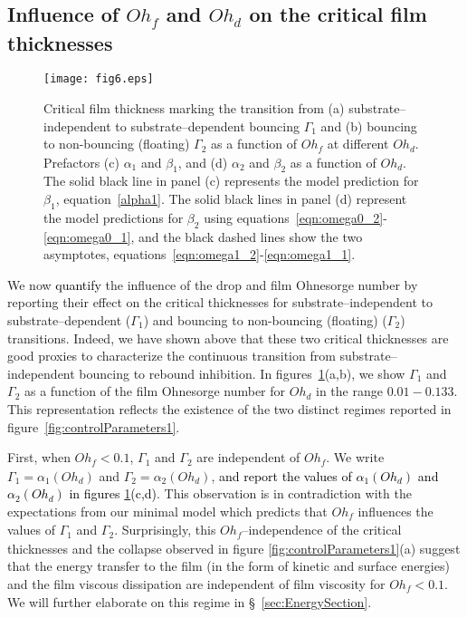 \documentclass[]{jfm}
\newcommand{\revRev}[1]{\textcolor{black}{#1}}
\newcommand{\Ohd}{\mathit{Oh}_\mathit{d}}
\newcommand{\Ohf}{\mathit{Oh}_\mathit{f}}
\begin{document}
\subsection{Influence of $\Ohf$ and $\Ohd$ on the critical film thicknesses}
\begin{figure}
	\centering
	\texttt{[image: fig6.eps]}
	\caption{Critical film thickness marking the transition from (a) substrate--independent to substrate--dependent bouncing $\Gamma_1$ and (b) bouncing to non-bouncing (floating) $\Gamma_2$ as a function of $\Ohf$ at different $\Ohd$. 
		Prefactors (c) $\alpha_{1}$ and $\beta_{1}$, and (d) $\alpha_{2}$ and $\beta_{2}$ as a function of $\Ohd$. 
		The solid black line in panel (c) represents the model prediction for $\beta_1$, equation~\eqref{alpha1}. 
		The solid black lines in panel (d) represent the model predictions for $\beta_2$ using equations~\eqref{eqn:omega0_2}-\eqref{eqn:omega0_1}, and the black dashed lines show the two asymptotes, equations~\eqref{eqn:omega1_2}-\eqref{eqn:omega1_1}.}
	\label{fig:Gamma1Gamma2}
\end{figure}

We now \revRev{quantify} the influence of the drop and film Ohnesorge number by reporting their effect on the critical thicknesses for substrate--independent to substrate--dependent ($\Gamma_1$) and bouncing to non-bouncing (floating) ($\Gamma_2$) transitions. Indeed, we have shown above that these two critical thicknesses are good proxies to characterize the continuous transition from substrate--independent bouncing to rebound inhibition. In figures~\ref{fig:Gamma1Gamma2}(a,b), we show $\Gamma_1$ and $\Gamma_2$ as a function of the film Ohnesorge number for $\Ohd$ in the range $0.01 - 0.133$. This representation reflects the existence of the two distinct regimes reported in figure~\ref{fig:controlParameters1}. 

First, when $\Ohf < 0.1$, $\Gamma_1$ and $\Gamma_2$ are independent of $\Ohf$. We write $\Gamma_1 = \alpha_1(\Ohd)$ and $\Gamma_2 = \alpha_2(\Ohd)$, \revRev{and report the values of $\alpha_1(\Ohd)$ and $\alpha_2(\Ohd)$ in figures \ref{fig:Gamma1Gamma2}(c,d)}. 
This observation is in contradiction with the expectations from our minimal model which predicts that $\Ohf$ influences the values of $\Gamma_1$ and $\Gamma_2$. Surprisingly, this $\Ohf$--independence of the critical thicknesses and the collapse observed in figure \ref{fig:controlParameters1}(a) suggest that the energy transfer to the film (in the form of kinetic and surface energies) and the film viscous dissipation are independent of film viscosity for $\Ohf < 0.1$. We will further elaborate on this regime in \S~\ref{sec:EnergySection}. 
\end{document}
